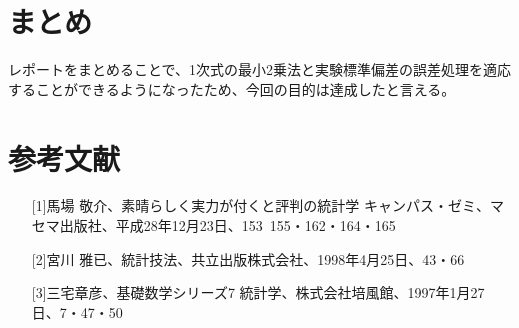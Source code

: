 \documentclass[10pt,a4paper]{jsarticle}
\numberwithin{equation}{section}
\numberwithin{figure}{section}
\numberwithin{table}{section}
\begin{document}
\newpage
\section{まとめ}
  レポートをまとめることで、1次式の最小2乗法と実験標準偏差の誤差処理を適応することができるようになったため、今回の目的は達成したと言える。
\section{参考文献}
\begin{itemize}
  \item [][1]馬場 敬介、素晴らしく実力が付くと評判の統計学 キャンパス・ゼミ、マセマ出版社、平成28年12月23日、153~155・162・164・165
  \item [][2]宮川 雅已、統計技法、共立出版株式会社、1998年4月25日、43・66
  \item [][3]三宅章彦、基礎数学シリーズ7 統計学、株式会社培風館、1997年1月27日、7・47・50
\end{itemize}
\end{document}
